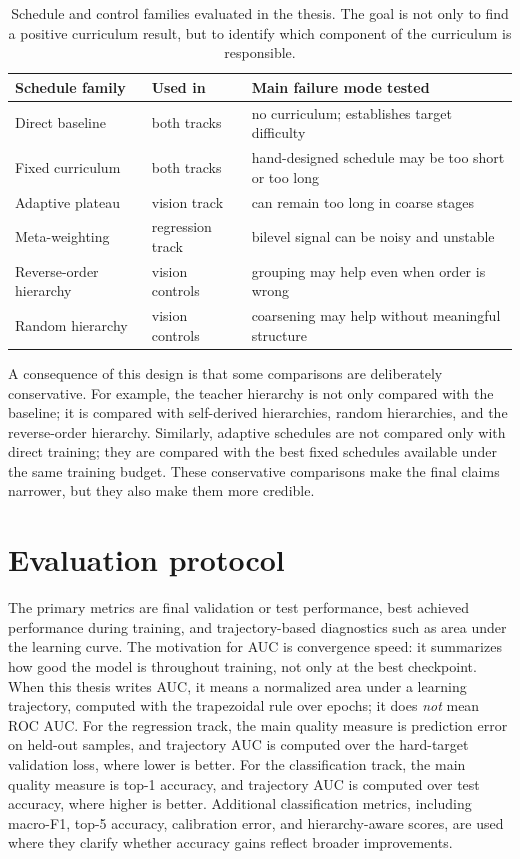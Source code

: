 \documentclass[english,master,a4paper,oneside]{ppfcmthesis}
\begin{document}
\begin{table}[htbp]
\centering
\small
\begin{tabular}{p{}p{}p{}}
\toprule
Schedule family & Used in & Main failure mode tested \\
\midrule
Direct baseline & both tracks & no curriculum; establishes target difficulty \\
Fixed curriculum & both tracks & hand-designed schedule may be too short or too long \\
Adaptive plateau & vision track & can remain too long in coarse stages \\
Meta-weighting & regression track & bilevel signal can be noisy and unstable \\
Reverse-order hierarchy & vision controls & grouping may help even when order is wrong \\
Random hierarchy & vision controls & coarsening may help without meaningful structure \\
\bottomrule
\end{tabular}
\caption{Schedule and control families evaluated in the thesis. The goal is not
only to find a positive curriculum result, but to identify which component of the
curriculum is responsible.}
\label{tab:method-schedule-families}
\end{table}

A consequence of this design is that some comparisons are deliberately
conservative. For example, the teacher hierarchy is not only compared with the
baseline; it is compared with self-derived hierarchies, random hierarchies, and
the reverse-order hierarchy. Similarly, adaptive schedules are not compared only
with direct training; they are compared with the best fixed schedules available
under the same training budget. These conservative comparisons make the final
claims narrower, but they also make them more credible.

\section{Evaluation protocol}

The primary metrics are final validation or test performance, best achieved
performance during training, and trajectory-based diagnostics such as area under
the learning curve. The motivation for AUC is convergence speed: it summarizes
how good the model is throughout training, not only at the best checkpoint. When
this thesis writes AUC, it means a normalized area under a learning trajectory,
computed with the trapezoidal rule over epochs; it does \emph{not} mean ROC AUC.
For the regression track, the main quality measure is prediction error on
held-out samples, and trajectory AUC is computed over the hard-target validation
loss, where lower is better. For the classification track, the main quality
measure is top-1 accuracy, and trajectory AUC is computed over test accuracy,
where higher is better. Additional classification metrics, including macro-F1,
top-5 accuracy, calibration error, and hierarchy-aware scores, are used where
they clarify whether accuracy gains reflect broader improvements.
\end{document}
